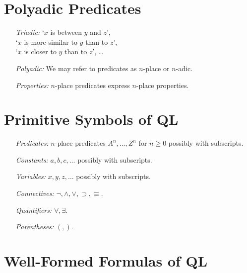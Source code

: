 \documentclass[a4paper, 11pt]{article} %
\begin{document}
\section*{Polyadic Predicates}

\begin{enumerate}
  \item[\it Triadic:] 
    `$x$ is between $y$ and $z$',\\
    `$x$ is more similar to $y$ than to $z$',\\
    `$x$ is closer to $y$ than to $z$', \ldots 
  \item[\it Polyadic:] We may refer to predicates as $n$-place or $n$-adic.
  \item[\it Properties:] $n$-place predicates express $n$-place properties.
\end{enumerate}





\section*{Primitive Symbols of QL}

\begin{enumerate}
  \item[\it Predicates:] $n$-place predicates $A^n,\ldots,Z^n$  for $n\geq 0$ possibly with subscripts.
  \item[\it Constants:] $a,b,c,\ldots$ possibly with subscripts.
  \item[\it Variables:] $x,y,z,\ldots$ possibly with subscripts.
  \item[\it Connectives:] $\neg, \wedge, \vee, \supset, \equiv$.
  \item[\it Quantifiers:] $\forall, \exists$.
  \item[\it Parentheses:] $(,)$.
\end{enumerate}




\section*{Well-Formed Formulas of QL}
\end{document}
